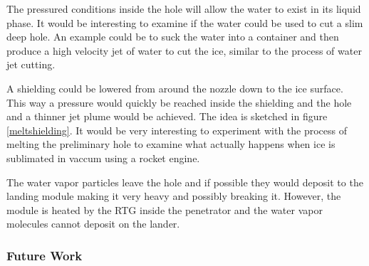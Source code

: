 The pressured conditions inside the hole will allow the water to exist in its liquid phase. It would be interesting to examine if the water could be used to cut a slim deep hole. An example could be to suck the water into a container and then produce a high velocity jet of water to cut the ice, similar to the process of water jet cutting. 

A shielding could be lowered from around the nozzle down to the ice surface. This way a pressure would quickly be reached inside the shielding and the hole and a thinner jet plume would be achieved. The idea is sketched in figure \ref{meltshielding}.
It would be very interesting to experiment with the process of melting the preliminary hole to examine what actually happens when ice is sublimated in vaccum using a rocket engine. 


The water vapor particles leave the hole and if possible they would deposit to the landing module making it very heavy and possibly breaking it. However, the module is heated by the RTG inside the penetrator and the water vapor molecules cannot deposit on the lander.

\subsubsection{Future Work}

